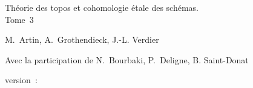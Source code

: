 \documentclass[12pt]{../fichiers-configuration-latex/amsbook}
\begin{document}
\begin{center}
{\Large Théorie des topos et cohomologie étale des schémas.\\
Tome 3}\\
\end{center}

\vskip1cm
\begin{center}
M. Artin, A. Grothendieck, J.-L. Verdier
\end{center}

\vskip1cm
\begin{center}
Avec la participation de N. Bourbaki, P. Deligne, B. Saint-Donat
\end{center}

version : \showgitstatus{}
\tableofcontents

\mainmatter

\def\danslelivre{1}

\setcounter{chapter}{8}
\def\thechapter{\Roman{chapter}}
\def\chaptername{Exposé}












\backmatter
\end{document}
